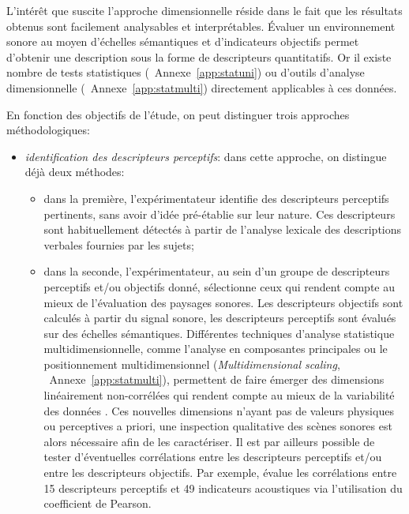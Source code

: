 L'intérêt que suscite l'approche dimensionnelle réside dans le fait que les résultats obtenus sont facilement analysables et interprétables. Évaluer un environnement sonore au moyen d'échelles sémantiques et d'indicateurs objectifs permet d'obtenir une description sous la forme de descripteurs quantitatifs. Or il existe nombre de tests statistiques (\cf~Annexe~\ref{app:statuni}) ou d'outils d'analyse dimensionnelle (\cf~Annexe~\ref{app:statmulti}) directement applicables à ces données.

En fonction des objectifs de l'étude, on peut distinguer trois approches méthodologiques:

\begin{itemize}

\item \emph{identification des descripteurs perceptifs}: dans cette approche, on distingue déjà deux méthodes:

\begin{itemize}
\item dans la première, l'expérimentateur identifie des descripteurs perceptifs pertinents, sans avoir d'idée pré-établie sur leur nature. Ces descripteurs sont habituellement détectés à partir de l'analyse lexicale des descriptions verbales fournies par les sujets;

\item dans la seconde, l'expérimentateur, au sein d'un groupe de descripteurs perceptifs et/ou objectifs donné, sélectionne ceux qui rendent compte au mieux de l'évaluation des paysages sonores. Les descripteurs objectifs sont calculés à partir du signal sonore, les descripteurs perceptifs sont évalués sur des échelles sémantiques. Différentes techniques d'analyse statistique multidimensionnelle, comme l'analyse en composantes principales ou le positionnement multidimensionnel (\emph{Multidimensional scaling}, \cf~Annexe~\ref{app:statmulti}), permettent de faire émerger des dimensions linéairement non-corrélées qui rendent compte au mieux de la variabilité des données \citep{cain2013development,torija2013application}. Ces nouvelles dimensions n'ayant pas de valeurs physiques ou perceptives a priori, une inspection qualitative des scènes sonores est alors nécessaire afin de les caractériser. Il est par ailleurs possible de tester d'éventuelles corrélations entre les descripteurs perceptifs et/ou entre les descripteurs objectifs. Par exemple, \citep{torija2013application} évalue les corrélations entre 15 descripteurs perceptifs et 49 indicateurs acoustiques via l'utilisation du coefficient de Pearson.
\end{itemize}


\end{itemize}
